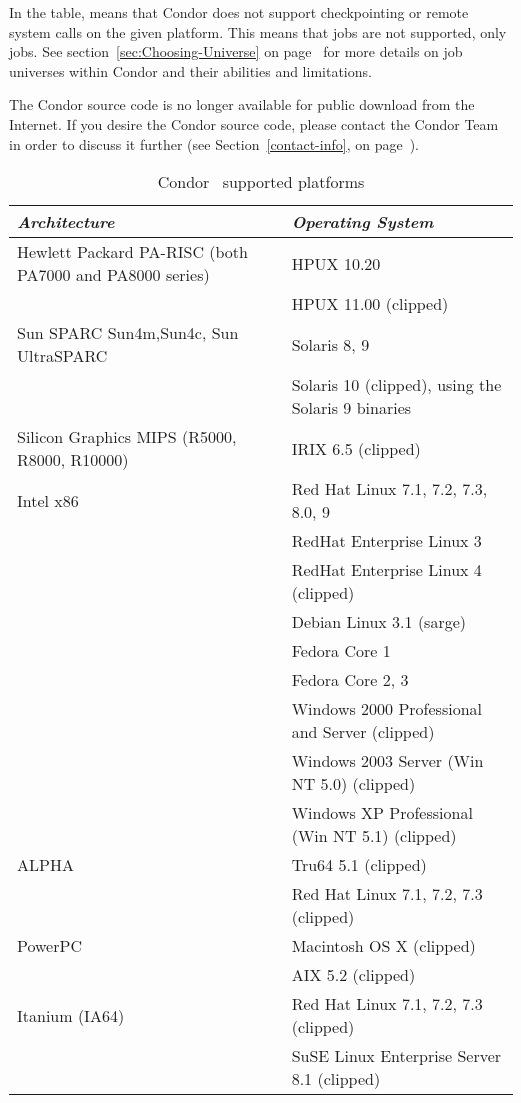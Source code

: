 In the table,  means that Condor does not support
checkpointing or remote system calls on the given platform. 
This means that  jobs are not supported, only
 jobs.
See section~\ref{sec:Choosing-Universe} on
page~\pageref{sec:Choosing-Universe} for more details on job universes
within Condor and their abilities and limitations.

The Condor source code is no longer available for public download from the Internet.  If you 
desire the Condor source code, please contact the Condor Team in order to discuss it further 
(see Section~\ref{contact-info}, on page~\pageref{contact-info}).

\begin{center}
\begin{table}[hbt]
\begin{tabular}{|ll|} \hline
\emph{Architecture} & \emph{Operating System} \\ \hline \hline
Hewlett Packard PA-RISC (both PA7000 and PA8000 series) & HPUX 10.20 \\
 & HPUX 11.00 (clipped) \\ \hline
Sun SPARC Sun4m,Sun4c, Sun UltraSPARC & Solaris 8, 9 \\
 & Solaris 10 (clipped), using the Solaris 9 binaries \\ \hline
Silicon Graphics MIPS (R5000, R8000, R10000) & IRIX 6.5 (clipped) \\ \hline
Intel x86 & Red Hat Linux 7.1, 7.2, 7.3, 8.0, 9 \\
 & RedHat Enterprise Linux 3 \\
 & RedHat Enterprise Linux 4 (clipped) \\
 & Debian Linux 3.1 (sarge) \\
 & Fedora Core 1 \\
 & Fedora Core 2, 3 \\
 & Windows 2000 Professional and Server (clipped) \\
 & Windows 2003 Server (Win NT 5.0) (clipped) \\
 & Windows XP Professional (Win NT 5.1) (clipped) \\ \hline
ALPHA & Tru64 5.1 (clipped) \\
 & Red Hat Linux 7.1, 7.2, 7.3 (clipped) \\ \hline
PowerPC & Macintosh OS X (clipped) \\
 & AIX 5.2 (clipped) \\ \hline
Itanium (IA64) & Red Hat Linux 7.1, 7.2, 7.3 (clipped) \\
& SuSE Linux Enterprise Server 8.1 (clipped) \\ \hline
\end{tabular}
\caption{\label{supported-platforms}Condor \VersionNotice\ supported platforms}
\end{table}
\end{center}


